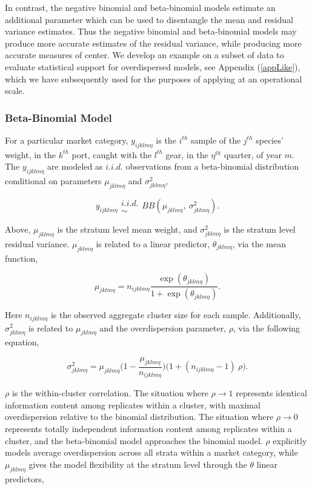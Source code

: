 \documentclass[12pt]{article}
\begin{document}
In contrast, the negative binomial and beta-binomial models estimate an
additional parameter which can be used to disentangle the mean and
residual variance estimates. Thus the negative binomial and
beta-binomial models may produce more accurate estimates of the residual
variance, while producing more accurate measures of center. We develop
an example on a subset of data to evaluate statistical support for 
overdispersed models, see Appendix (\ref{appLike}), which we have 
subsequently used for the purposes of applying at an operational scale.

\subsubsection{Beta-Binomial Model}\label{bbModel}

For a particular market category, \(y_{ijklm\eta}\) is the \(i^{th}\)
sample of the \(j^{th}\) species' weight, in the \(k^{th}\) port, caught
with the \(l^{th}\) gear, in the \(\eta^{th}\) quarter, of year \(m\).
The \(y_{ijklm\eta}\) are modeled as $i.i.d.$ observations from a beta-binomial 
distribution conditional on parameters \(\mu_{jklm\eta}\) and 
\(\sigma^2_{jklm\eta}\),

\[y_{ijklm\eta} \substack{i.i.d.\\\sim} BB(\mu_{jklm\eta},~\sigma^2_{jklm\eta}).\]

Above, \(\mu_{jklm\eta}\) is the stratum level mean weight, and
\(\sigma^2_{jklm\eta}\) is the stratum level residual variance.
\(\mu_{jklm\eta}\) is related to a linear predictor,
\(\theta_{jklm\eta}\), via the mean function,

\[\mu_{jklm\eta} = n_{ijklm\eta}\frac{\exp(\theta_{jklm\eta})}{1+\exp(\theta_{jklm\eta})}.\]%

Here \(n_{ijklm\eta}\) is the observed aggregate cluster size for each
sample. Additionally, \(\sigma^2_{jklm\eta}\) is related to
\(\mu_{jklm\eta}\) and the overdispersion parameter, \(\rho\), via the
following equation,

\[\sigma^2_{jklm\eta} = \mu_{jklm\eta}\Big(1-\frac{\mu_{jklm\eta}}{n_{ijklm\eta}}\Big)\Big(1+(n_{ijklm\eta}-1)~\rho\Big).\]

\(\rho\) is the within-cluster correlation. The situation where
\(\rho\rightarrow1\) represents identical information content among
replicates within a cluster, with maximal overdispersion relative to the
binomial distribution. The situation where \(\rho\rightarrow0\)
represents totally independent information content among replicates
within a cluster, and the beta-binomial model approaches the binomial
model. \(\rho\) explicitly models average overdispersion across all
strata within a market category, while \(\mu_{jklm\eta}\) gives the
model flexibility at the stratum level through the \(\theta\) linear
predictors,
\end{document}
